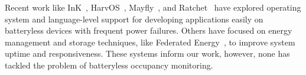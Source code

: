 Recent work like InK~\cite{yildirim2018ink}, HarvOS~\cite{bhatti2017harvos}, Mayfly~\cite{hester2017mayfly}, and Ratchet~\cite{van2016intermittent} have explored operating system and language-level support for developing applications easily on batteryless devices with frequent power failures.
Others have focused on energy management and storage techniques, like  Federated Energy~\cite{jhester:ufop:sensys}, to improve system uptime and responsiveness.
These systems inform our work, however, none has tackled the problem of batteryless occupancy monitoring.

